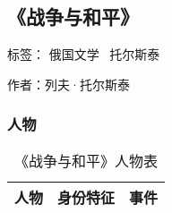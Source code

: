 \subsection{《战争与和平》}

标签： 俄国文学 \  托尔斯泰

作者：列夫·托尔斯泰

\subsubsection{人物}

\begin{longtable}{p{}|p{}|p{}}
\caption{《战争与和平》人物表}\\
\hline
人物 & 身份特征 & 事件 \\
\hline
\endhead


\end{longtable}
